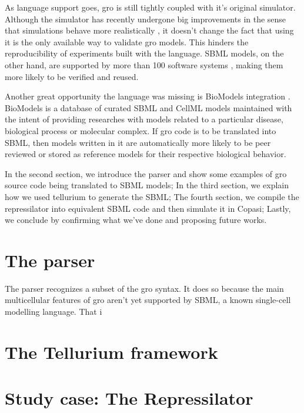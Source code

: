 \documentclass[12pt]{article}
\begin{document}
    As language support goes, gro is still tightly coupled with it's original simulator. Although the simulator has recently undergone big improvements in the sense that simulations behave more realistically \cite{Gutirrez2017}, it doesn't change the fact that using it is the only available way to validate gro models. This hinders the reproducibility of experiments built with the language. SBML models, on the other hand, are supported by more than 100 software systems \cite{Hucka2007}, making them more likely to be verified and reused.
    
    Another great opportunity the language was missing is BioModels integration \cite{LeNovere2006}. BioModels is a database of curated SBML and CellML models maintained with the intent of providing researches with models related to a particular disease, biological process or molecular complex. If gro code is to be translated into SBML, then models written in it are automatically more likely to be peer reviewed or stored as reference models for their respective biological behavior.

    In the second section, we introduce the parser and show some examples of gro source code being translated to SBML models; In the third section, we explain how we used tellurium to generate the SBML; The fourth section, we compile the repressilator into equivalent SBML code and then simulate it in Copasi; Lastly, we conclude by confirming what we've done and proposing future works.
    
    
\section{The parser}
    The parser recognizes a subset of the gro syntax. It does so because the main multicellular features of gro aren't yet supported by SBML, a known single-cell modelling language. That i

\section{The Tellurium framework}
    \lipsum[1]

\section{Study case: The Repressilator}
    \lipsum[1]
\end{document}
